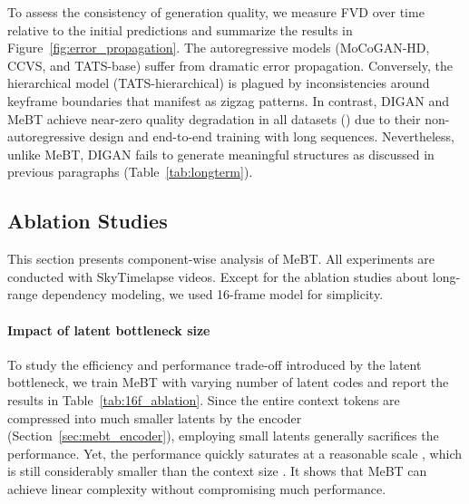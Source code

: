 \documentclass[10pt,twocolumn,letterpaper]{article}
\newcommand{\cutparagraphup}{\vspace*{-0.1in}}
\begin{document}
To assess the consistency of generation quality, we measure FVD over time relative to the initial predictions and summarize the results in Figure~\ref{fig:error_propagation}.
The autoregressive models (MoCoGAN-HD, CCVS, and TATS-base) suffer from dramatic error propagation. Conversely, the hierarchical model (TATS-hierarchical) is plagued by inconsistencies around keyframe boundaries that manifest as zigzag patterns. In contrast, DIGAN and MeBT achieve near-zero quality degradation in all datasets () due to their non-autoregressive design and end-to-end training with long sequences. Nevertheless, unlike MeBT, DIGAN fails to generate meaningful structures as discussed in previous paragraphs (Table~\ref{tab:longterm}).

\subsection{Ablation Studies}
\label{sec:ablation_study}
This section presents component-wise analysis of MeBT. 
All experiments are conducted with SkyTimelapse videos. Except for the ablation studies about long-range dependency modeling, we used 16-frame model for simplicity.

\cutparagraphup
\paragraph{Impact of latent bottleneck size}
To study the efficiency and performance trade-off introduced by the latent bottleneck, we train MeBT with varying number of latent codes and report the results in Table~\ref{tab:16f_ablation}.
Since the entire context tokens are compressed into much smaller latents by the encoder (Section~\ref{sec:mebt_encoder}), employing small latents generally sacrifices the performance. 
Yet, the performance quickly saturates at a reasonable scale , which is still considerably smaller than the context size .
It shows that MeBT can achieve linear complexity without compromising much performance.



\iffalse
Fig.\ref{fig:latent_bottleneck} shows the change of FVD over the training memory cost by controlling the size of the latent bottleneck. 
By increasing the size of the latent bottleneck, the model's performance increases at the cost of efficiency. 
Interestingly, the performance of the model seems to be saturated when . 
This indicates that the context can be expressed with fewer tokens. 
When modeling a 16-frame video expressed with 1024 tokens, only 256 tokens corresponding to a 4-frame clip was enough to express the context.
\fi
\end{document}
